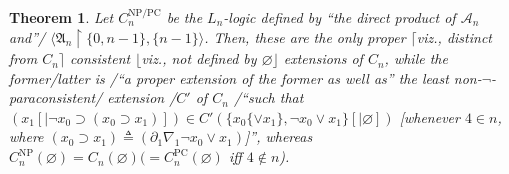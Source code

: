 \documentclass[bsl,meeting]{asl}
\newcommand{\mf}[1]{\mathfrak{#1}}
\newcommand{\mc}[1]{\mathcal{#1}}
\newcommand{\couple}[2]{\langle{#1},{#2}\rangle}
\newcommand{\restr}{{\upharpoonright}}
\newtheorem{theorem}{Theorem}
\begin{document}
\begin{theorem}
\label{ext-thm}
Let\/ $C_n^{\mathrm{NP/PC}}$ be the $L_n$-logic defined by
``the direct product of $\mc{A}_n$ and''/
$\couple{\mf{A}_n\restr\{0,n-1\}}{\{n-1\}}$.
Then, these are the only proper\/ $\lceil$viz., distinct from\/ $C_n\rceil$
consistent\/ $\lfloor$viz., not defined by\/ $\varnothing\rfloor$ extensions of\/
$C_n$, while the former/latter is /``a proper extension of the former
as well as''
the least
non-$\neg$-paraconsistent/ extension /\/$C'$ of\/ $C_n$
/``such that $(x_1[|\neg x_0\supset(x_0\supset x_1)])\in C'(\{x_0\{\lor x_1\},\neg x_0\lor
x_1\}[|\varnothing])$ [whenever\/ $4\in n$,
where\/ $(x_0\supset x_1)\triangleq(\partial_1\nabla_1\neg x_0\lor
x_1)$]'', whereas\/
$C_n^{\mathrm{NP}}(\varnothing)=C_n(\varnothing)(=C_n^{\mathrm{PC}}(\varnothing)$ iff\/
$4\not\in n$).
\end{theorem}

\vspace*{-0.5\baselineskip}
\end{document}
